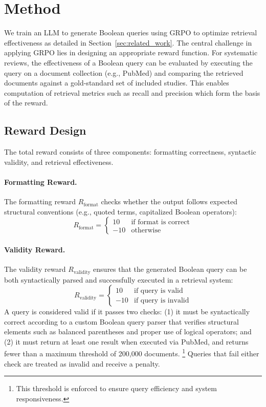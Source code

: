 \section{Method}
We train an LLM to generate Boolean queries using GRPO to optimize retrieval effectiveness as detailed in Section~\ref{sec:related_work}. The central challenge in applying GRPO lies in designing an appropriate reward function. For systematic reviews, the effectiveness of a Boolean query can be evaluated by executing the query on a document collection (e.g., PubMed) and comparing the retrieved documents against a gold-standard set of included studies. This enables computation of retrieval metrics such as recall and precision which form the basis of the reward.

\subsection{Reward Design}
\label{sec:retrieval_reward}
The total reward consists of three components: formatting correctness, syntactic validity, and retrieval effectiveness.

\paragraph{Formatting Reward.}
The formatting reward \( R_{\text{format}} \) checks whether the output follows expected structural conventions (e.g., quoted terms, capitalized Boolean operators):
\begin{equation}\label{eq:format_reward}
	R_{\text{format}} =
	\begin{cases}
		10 & \text{if format is correct} \\
		-10 & \text{otherwise}
	\end{cases}
\end{equation}
\paragraph{Validity Reward.}
The validity reward \( R_{\text{validity}} \) ensures that the generated Boolean query can be both syntactically parsed and successfully executed in a retrieval system:
\begin{equation}\label{eq:validity_reward}
	R_{\text{validity}} =
	\begin{cases}
		10 & \text{if query is valid} \\
		-10 & \text{if query is invalid}
	\end{cases}
\end{equation}
A query is considered valid if it passes two checks:
(1) it must be syntactically correct according to a custom Boolean query parser that verifies structural elements such as balanced parentheses and proper use of logical operators; and
(2) it must return at least one result when executed via PubMed, and returns fewer than a maximum threshold of 200,000 documents.%
\footnote{This threshold is enforced to ensure query efficiency and system responsiveness.}
Queries that fail either check are treated as invalid and receive a penalty.

